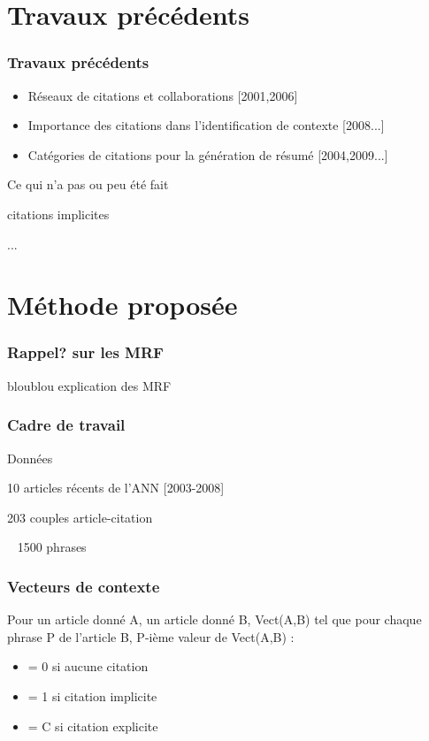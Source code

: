 \documentclass[12pt]{beamer}
\begin{document}
\section{Travaux précédents}
\begin{frame}
  \frametitle{Travaux précédents}
  \begin{itemize}
    \item Réseaux de citations et collaborations [2001,2006]
    \item Importance des citations dans l'identification de contexte [2008...]
    \item Catégories de citations pour la génération de résumé [2004,2009...]
  \end{itemize}

  \begin{block}{Ce qui n'a pas ou peu été fait}
    \item citations implicites
    \item ...
  \end{block}


\end{frame}

\section{Méthode proposée}
\begin{frame}
  \frametitle{Rappel? sur les MRF}
  \begin{block}{bloublou explication des MRF}
  \end{block}
\end{frame}

\begin{frame}
  \frametitle{Cadre de travail}
  \begin{block}{Données}
    \item 10 articles récents de l'ANN [2003-2008]
    \item 203 couples article-citation
    \item ~ 1500 phrases
  \end{block}
\end{frame}

\begin{frame}
  \frametitle{Vecteurs de contexte}
  Pour un article donné A, un article donné B,
  Vect(A,B) tel que pour chaque phrase P de l'article B, P-ième valeur de Vect(A,B) :
  \begin{itemize}
    \item = 0 si aucune citation
    \item = 1 si citation implicite
    \item = C si citation explicite
  \end{itemize}
\end{frame}
\end{document}
